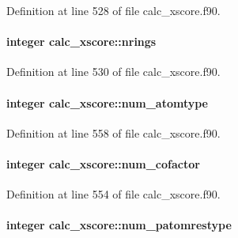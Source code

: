 Definition at line 528 of file calc\-\_\-xscore.\-f90.

\hypertarget{classcalc__xscore_aec9b7ef038158c34c0ef51739fefa270}{
\paragraph[{nrings}]{\setlength{\rightskip}{0pt plus 5cm}integer calc\-\_\-xscore\-::nrings}}\label{classcalc__xscore_aec9b7ef038158c34c0ef51739fefa270}


Definition at line 530 of file calc\-\_\-xscore.\-f90.

\hypertarget{classcalc__xscore_adc4b3c5ced522a1b882b9af890dacbf9}{
\paragraph[{num\-\_\-atomtype}]{\setlength{\rightskip}{0pt plus 5cm}integer calc\-\_\-xscore\-::num\-\_\-atomtype}}\label{classcalc__xscore_adc4b3c5ced522a1b882b9af890dacbf9}


Definition at line 558 of file calc\-\_\-xscore.\-f90.

\hypertarget{classcalc__xscore_acdff1eeb76e14d339fa4f21f302ef3a6}{
\paragraph[{num\-\_\-cofactor}]{\setlength{\rightskip}{0pt plus 5cm}integer calc\-\_\-xscore\-::num\-\_\-cofactor}}\label{classcalc__xscore_acdff1eeb76e14d339fa4f21f302ef3a6}


Definition at line 554 of file calc\-\_\-xscore.\-f90.

\hypertarget{classcalc__xscore_a75c5e07f748c364d1cca2d3c7102f34f}{
\paragraph[{num\-\_\-patomrestype}]{\setlength{\rightskip}{0pt plus 5cm}integer calc\-\_\-xscore\-::num\-\_\-patomrestype}}\label{classcalc__xscore_a75c5e07f748c364d1cca2d3c7102f34f}


